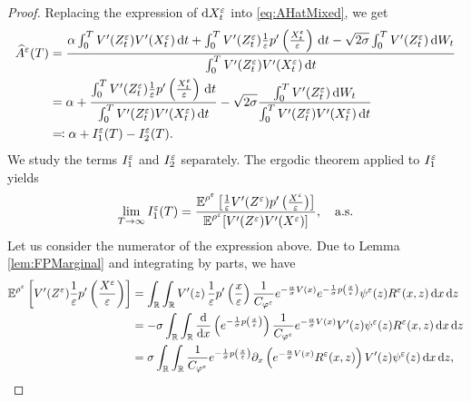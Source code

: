 \documentclass[10pt]{article}
\begin{document}
\begin{proof} Replacing the expression of $\mathrm{d} X^\varepsilon_t$ into \eqref{eq:AHatMixed}, we get
\begin{equation}\label{Ahat_decomposition}
\begin{aligned} \nonumber
\widehat A^\varepsilon(T) &= \frac{\alpha \int_0^T V'(Z^\varepsilon_t) V'(X^\varepsilon_t) \,\mathrm{d} t + \int_0^T V'(Z^\varepsilon_t) \frac1{\varepsilon}  p' \left ( \frac{X^\varepsilon_t}{\varepsilon} \right )\,\mathrm{d} t - \sqrt{2\sigma} \int_0^T V'(Z^\varepsilon_t) \,\mathrm{d} W_t}{\int_0^T V'(Z^\varepsilon_t) V'(X^\varepsilon_t) \,\mathrm{d} t} \\ 
&= \alpha + \frac{\int_0^T V'(Z^\varepsilon_t) \frac1{\varepsilon}  p' \left ( \frac{X^\varepsilon_t}{\varepsilon} \right )\,\mathrm{d} t}{\int_0^T V'(Z^\varepsilon_t) V'(X^\varepsilon_t) \,\mathrm{d} t} - \sqrt{2\sigma} \frac{\int_0^T V'(Z^\varepsilon_t) \,\mathrm{d} W_t}{\int_0^T V'(Z^\varepsilon_t) V'(X^\varepsilon_t) \,\mathrm{d} t}\\
&\eqqcolon \alpha + I_1^\varepsilon(T) - I_2^\varepsilon(T).
\end{aligned}
\end{equation}
We study the terms $I_1^\varepsilon$ and $I_2^\varepsilon$ separately. The ergodic theorem applied to $I_1^\varepsilon$ yields
\begin{equation}\label{limit_estimator}
\lim_{T \to \infty} I_1^\varepsilon(T) = \frac{\operatorname{\mathbb{E}}^{\rho^\varepsilon} \left [ \frac{1}{\varepsilon} V'(Z^\varepsilon) p' \left ( \frac{X^\varepsilon}{\varepsilon} \right ) \right ]}{\operatorname{\mathbb{E}}^{\rho^\varepsilon} [ V'(Z^\varepsilon) V'(X^\varepsilon) ]}, \quad \text{a.s.}
\end{equation}
Let us consider the numerator of the expression above. Due to Lemma \ref{lem:FPMarginal} and integrating by parts, we have
\begin{equation}
\begin{aligned}
	\operatorname{\mathbb{E}}^{\rho^\varepsilon} \left [ V'(Z^\varepsilon) \frac1{\varepsilon} p' \left ( \frac{X^\varepsilon}{\varepsilon} \right ) \right ] &= \int_{\mathbb{R}} \int_{\mathbb{R}} V'(z) \, \frac1{\varepsilon} p' \left ( \frac{x}{\varepsilon} \right ) \frac{1}{C_{\varphi^\varepsilon}} e^{- \frac{\alpha}{\sigma} V(x)} e^{ - \frac{1}{\sigma} p \left ( \frac{x}{\varepsilon} \right)} \psi^\varepsilon(z) R^\varepsilon(x,z) \,\mathrm{d} x \,\mathrm{d} z \\
	&= -\sigma \int_{\mathbb{R}} \int_{\mathbb{R}} \frac{\mathrm{d}}{\mathrm{d} x}\left( e^{ - \frac{1}{\sigma} p \left ( \frac{x}{\varepsilon} \right)} \right) \frac{1}{C_{\varphi^\varepsilon}} e^{- \frac{\alpha}{\sigma} V(x)} V'(z) \psi^\varepsilon(z) R^\varepsilon(x,z) \,\mathrm{d} x \,\mathrm{d} z \\
	&= \sigma \int_{\mathbb{R}} \int_{\mathbb{R}} \frac{1}{C_{\varphi^\varepsilon}} e^{ - \frac{1}{\sigma} p \left ( \frac{x}{\varepsilon} \right)} \partial_x \left ( e^{- \frac{\alpha}{\sigma} V(x)} R^\varepsilon(x,z) \right ) V'(z) \psi^\varepsilon(z) \,\mathrm{d} x \,\mathrm{d} z,
\end{aligned}
\end{equation}

\end{proof}
\end{document}
